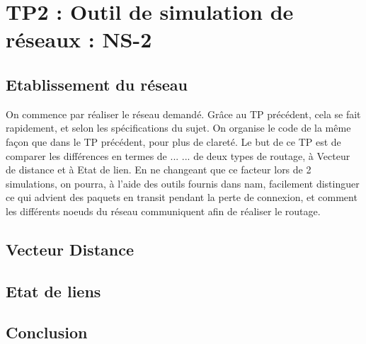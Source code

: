\chapter{TP2 : Outil de simulation de réseaux : NS-2}
    \section{Etablissement du réseau}
      On commence par réaliser le réseau demandé. Grâce au TP précédent, cela se fait rapidement, et selon les spécifications du sujet. On organise le code de la même façon que dans le TP précédent, pour plus de clareté. Le but de ce TP est de comparer les différences en termes de ... ... de deux types de routage, à Vecteur de distance et à Etat de lien. En ne changeant que ce facteur lors de 2 simulations, on pourra, à l'aide des outils fournis dans nam, facilement distinguer ce qui advient des paquets en transit pendant la perte de connexion, et comment les différents noeuds du réseau communiquent afin de réaliser le routage.
    \section{Vecteur Distance}


    \section{Etat de liens}

    \section{Conclusion}
